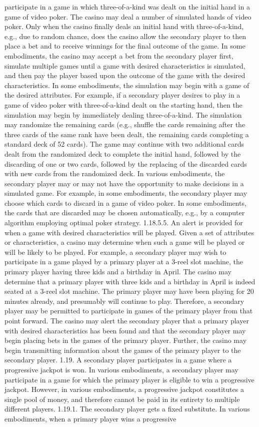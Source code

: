 \documentclass[11pt,a4paper]{article}
\begin{document}
participate in a game in which three-of-a-kind was dealt on the initial hand in a game of video poker. The casino may deal a number of simulated hands of video poker. Only when the casino finally deals an initial hand with three-of-a-kind, e.g., due to random chance, does the casino allow the secondary player to then place a bet and to receive winnings for the final outcome of the game. In some embodiments, the casino may accept a bet from the secondary player first, simulate multiple games until a game with desired characteristics is simulated, and then pay the player based upon the outcome of the game with the desired characteristics. In some embodiments, the simulation may begin with a game of the desired attributes. For example, if a secondary player desires to play in a game of video poker with three-of-a-kind dealt on the starting hand, then the simulation may begin by immediately dealing three-of-a-kind. The simulation may randomize the remaining cards (e.g., shuffle the cards remaining after the three cards of the same rank have been dealt, the remaining cards completing a standard deck of 52 cards). The game may continue with two additional cards dealt from the randomized deck to complete the initial hand, followed by the discarding of one or two cards, followed by the replacing of the discarded cards with new cards from the randomized deck. In various embodiments, the secondary player may or may not have the opportunity to make decisions in a simulated game. For example, in some embodiments, the secondary player may choose which cards to discard in a game of video poker. In some embodiments, the cards that are discarded may be chosen automatically, e.g., by a computer algorithm employing optimal poker strategy. 1.18.5.5. An alert is provided for when a game with desired characteristics will be played. Given a set of attributes or characteristics, a casino may determine when such a game will be played or will be likely to be played. For example, a secondary player may wish to participate in a game played by a primary player at a 3-reel slot machine, the primary player having three kids and a birthday in April. The casino may determine that a primary player with three kids and a birthday in April is indeed seated at a 3-reel slot machine. The primary player may have been playing for 20 minutes already, and presumably will continue to play. Therefore, a secondary player may be permitted to participate in games of the primary player from that point forward. The casino may alert the secondary player that a primary player with desired characteristics has been found and that the secondary player may begin placing bets in the games of the primary player. Further, the casino may begin transmitting information about the games of the primary player to the secondary player. 1.19. A secondary player participates in a game where a progressive jackpot is won. In various embodiments, a secondary player may participate in a game for which the primary player is eligible to win a progressive jackpot. However, in various embodiments, a progressive jackpot constitutes a single pool of money, and therefore cannot be paid in its entirety to multiple different players. 1.19.1. The secondary player gets a fixed substitute. In various embodiments, when a primary player wins a progressive 
\end{document}
